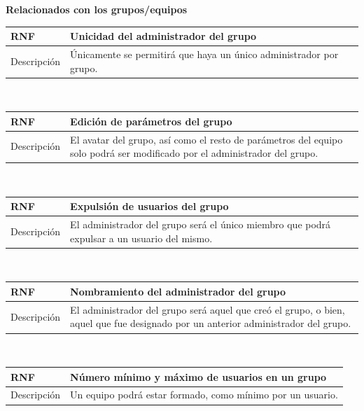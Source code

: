 \documentclass[twoside]{report}
\newcommand\addrow[2]{#1 &#2\\ }
\newcommand\addheading[2]{#1 &#2\\ \hline}
\newcommand\tabularhead{\begin{tabular}{lp{0.7\textwidth}}
\hline
}
\newenvironment{req}{\tabularhead}
{\hline\end{tabular}}
\begin{document}
\vspace{1cm}

\textbf{Relacionados con los grupos/equipos}\\

\begin{req}
	\addheading{\textbf{RNF\arabic{nonFunctionalRequirements}}}{Unicidad del administrador del grupo}
	\addrow{Descripción}{Únicamente se permitirá que haya un único administrador por grupo.}
\end{req}\\

\vspace{0.25cm}

\begin{req}
	\addheading{\textbf{RNF\arabic{nonFunctionalRequirements}}}{Edición de parámetros del grupo}
	\addrow{Descripción}{El avatar del grupo, así como el resto de parámetros del equipo solo podrá ser modificado por el administrador del grupo.}
\end{req}\\

\vspace{0.25cm}

\begin{req}
	\addheading{\textbf{RNF\arabic{nonFunctionalRequirements}}}{Expulsión de usuarios del grupo}
	\addrow{Descripción}{El administrador del grupo será el único miembro que podrá expulsar a un usuario del mismo.}
\end{req}\\

\vspace{0.25cm}

\begin{req}
	\addheading{\textbf{RNF\arabic{nonFunctionalRequirements}}}{Nombramiento del administrador del grupo}
	\addrow{Descripción}{El administrador del grupo será aquel que creó el grupo, o bien, aquel que fue designado por un anterior administrador del grupo.}
\end{req}\\

\vspace{0.25cm}

\begin{req}
	\addheading{\textbf{RNF\arabic{nonFunctionalRequirements}}}{Número mínimo y máximo de usuarios en un grupo}
	\addrow{Descripción}{Un equipo podrá estar formado, como mínimo por un usuario.}
\end{req}\\
\end{document}
